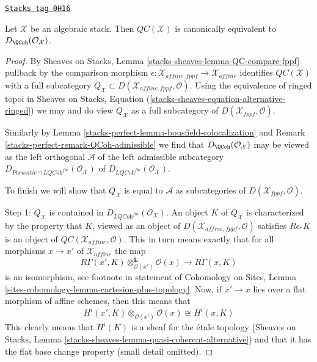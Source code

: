 \begin{proposition}[QC compare]
\label{stacks-perfect-proposition-QC-compare}
\href{https://stacks.math.columbia.edu/tag/0H16}{\texttt{Stacks tag 0H16}}

Let $\mathcal{X}$ be an algebraic stack. Then $\mathit{QC}(\mathcal{X})$
is canonically equivalent to $D_\QCoh(\mathcal{O}_\mathcal{X})$.
\end{proposition}

\begin{proof}
By Sheaves on Stacks, Lemma \ref{stacks-sheaves-lemma-QC-compare-fppf}
pullback by the comparison morphism
$\epsilon : \mathcal{X}_{affine, fppf} \to \mathcal{X}_{affine}$
identifies $\mathit{QC}(\mathcal{X})$ with a full subcategory
$Q_\mathcal{X} \subset D(\mathcal{X}_{affine, fppf}, \mathcal{O})$.
Using the equivalence of ringed topoi in
Sheaves on Stacks, Equation (\ref{stacks-sheaves-equation-alternative-ringed})
we may and do view $Q_\mathcal{X}$ as a full subcategory of
$D(\mathcal{X}_{fppf}, \mathcal{O})$.

\medskip\noindent
Similarly by Lemma \ref{stacks-perfect-lemma-bousfield-colocalization} and
Remark \ref{stacks-perfect-remark-QCoh-admissible} we find that
$D_\QCoh(\mathcal{O}_\mathcal{X})$ may be viewed as the
left orthogonal $\mathcal{A}$ of the left admissible subcategory
$D_{\textit{Parasitic} \cap \textit{LQCoh}^{fbc}}(\mathcal{O}_\mathcal{X})$
of $D_{\textit{LQCoh}^{fbc}}(\mathcal{O}_\mathcal{X})$.

\medskip\noindent
To finish we will show that $Q_\mathcal{X}$ is equal to
$\mathcal{A}$ as subcategories of $D(\mathcal{X}_{fppf}, \mathcal{O})$.

\medskip\noindent
Step 1: $Q_\mathcal{X}$ is contained in
$D_{\textit{LQCoh}^{fbc}}(\mathcal{O}_\mathcal{X})$.
An object $K$ of $Q_\mathcal{X}$ is characterized by the property
that $K$, viewed as an object of $D(\mathcal{X}_{affine, fppf}, \mathcal{O})$
satisfies $R\epsilon_*K$ is an object of
$\mathit{QC}(\mathcal{X}_{affine}, \mathcal{O})$.
This in turn means exactly that for all morphisms $x \to x'$
of $\mathcal{X}_{affine}$ the map
$$
R\Gamma(x', K) \otimes_{\mathcal{O}(x')}^\mathbf{L} \mathcal{O}(x)
\longrightarrow
R\Gamma(x, K)
$$
is an isomorphism, see footnote in statement of Cohomology on Sites,
Lemma \ref{sites-cohomology-lemma-cartesion-plus-topology}.
Now, if $x' \to x$ lies over a flat morphism of affine schemes,
then this means that
$$
H^i(x', K) \otimes_{\mathcal{O}(x')} \mathcal{O}(x)
\cong
H^i(x, K)
$$
This clearly means that $H^i(K)$ is a sheaf for the \'etale topology
(Sheaves on Stacks, Lemma \ref{stacks-sheaves-lemma-quasi-coherent-alternative})
and that it has the flat base change property (small detail omitted).


\end{proof}

